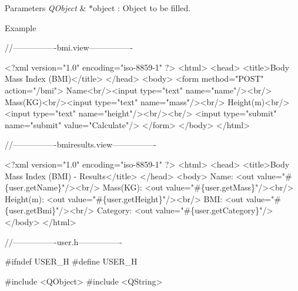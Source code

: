 \begin{DoxyParams}{Parameters}
{\em Q\+Object} & $\ast$object \+: Object to be filled. \\
\hline
\end{DoxyParams}
\begin{DoxyParagraph}{Example}

\begin{DoxyCode}
\textcolor{comment}{//----------------bmi.view----------------}

<?xml version=\textcolor{stringliteral}{"1.0"} encoding=\textcolor{stringliteral}{"iso-8859-1"} ?>
<html>
     <head>
         <title>Body Mass Index (BMI)</title>
     </head>
     <body>
         <form method=\textcolor{stringliteral}{"POST"} action=\textcolor{stringliteral}{"/bmi"}>
             Name<br/><input type=\textcolor{stringliteral}{"text"} name=\textcolor{stringliteral}{"name"}/><br/>
             Mass(KG)<br/><input type=\textcolor{stringliteral}{"text"} name=\textcolor{stringliteral}{"mass"}/><br/>
             Height(m)<br/><input type=\textcolor{stringliteral}{"text"} name=\textcolor{stringliteral}{"height"}/><br/><br/>
             <input type=\textcolor{stringliteral}{"submit"} name=\textcolor{stringliteral}{"submit"} value=\textcolor{stringliteral}{"Calculate"}/>
         </form>
     </body>
 </html>

\textcolor{comment}{//----------------bmiresults.view----------------}

<?xml version=\textcolor{stringliteral}{"1.0"} encoding=\textcolor{stringliteral}{"iso-8859-1"} ?>
<html>
     <head>
         <title>Body Mass Index (BMI) - Results</title>
     </head>
     <body>
         Name: <out value=\textcolor{stringliteral}{"#\{user.getName\}"}/><br/>
         Mass(KG): <out value=\textcolor{stringliteral}{"#\{user.getMass\}"}/><br/>
         Height(m): <out value=\textcolor{stringliteral}{"#\{user.getHeight\}"}/><br/>
         BMI: <out value=\textcolor{stringliteral}{"#\{user.getBmi\}"}/><br/>
         Category: <out value=\textcolor{stringliteral}{"#\{user.getCategory\}"}/>
     </body>
</html>

\textcolor{comment}{//----------------user.h----------------}

#ifndef USER\_H
#define USER\_H

#include <QObject>
#include <QString>


\end{DoxyCode}
\end{DoxyParagraph}
